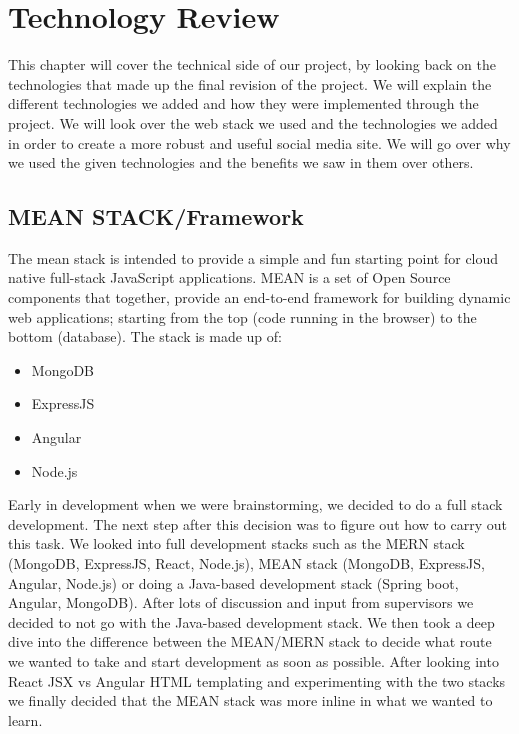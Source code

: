\chapter{Technology Review}
This chapter will cover the technical side of our project, by looking back on the technologies that made up the final revision of the project. We will explain the different technologies we added and how they were implemented through the project. We will look over the web stack we used and the technologies we added in order to create a more robust and useful social media site. We will go over why we used the given technologies and the benefits we saw in them over others.

\section{MEAN STACK/Framework}
The mean stack is intended to provide a simple and fun starting point for cloud native full-stack JavaScript applications. MEAN is a set of Open Source components that together, provide an end-to-end framework for building dynamic web applications; starting from the top (code running in the browser) to the bottom (database). The stack is made up of:

\begin{itemize}
\item MongoDB
\item ExpressJS
\item Angular
\item Node.js
\end{itemize}

Early in development when we were brainstorming, we decided to do a full stack development. The next step after this decision was to figure out how to carry out this task. We looked into full development stacks such as the MERN stack (MongoDB, ExpressJS, React, Node.js), MEAN stack (MongoDB, ExpressJS, Angular, Node.js) or doing a Java-based development stack (Spring boot, Angular, MongoDB). After lots of discussion and input from supervisors we decided to not go with the Java-based development stack. We then took a deep dive into the difference between the MEAN/MERN stack to decide what route we wanted to take and start development as soon as possible. After looking into React JSX vs Angular HTML templating and experimenting with the two stacks we finally decided that the MEAN stack was more inline in what we wanted to learn.

